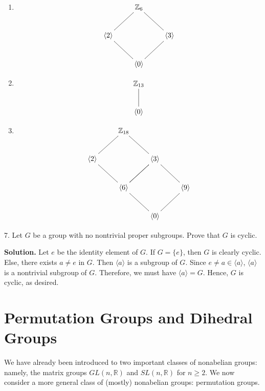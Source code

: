 \documentclass[10pt,]{book}
\theoremstyle{plain}
\theoremstyle{definition}
\theoremstyle{definition}
\theoremstyle{definition}
\theoremstyle{definition}
\numberwithin{equation}{section}
\def\Z{\mathbb{Z}}
\def\R{\mathbb{R}}
\begin{document}
\begin{exerciselist}
\begin{enumerate}[label=(\alph*)]
\item\hypertarget{li-321}{}{
\[\xymatrix{&\Z_6&\\ \langle 2\rangle \ar@{-}[ur]&&\langle 3\rangle\ar@{-}[ul]\\&\langle 0\rangle \ar@{-}[ul]\ar@{-}[ur]&}\]
}
%
\item\hypertarget{li-322}{}{
\[\xymatrix{\Z_{13}\ar@{-}[d]\\ \langle0\rangle}\]
}
%
\item\hypertarget{li-323}{}{
\[\xymatrix{&\Z_{18}&&\\ \langle 2\rangle\ar@{-}[ur]\ar@{-}[dr]&&\langle 3\rangle\ar@{-}[ul]\ar@{-}[dl]&\\
&\langle 6 \rangle \ar@{-}[dr]\ar@{-}[ur]&& \langle 9 \rangle \ar@{-}[dl]\ar@{-}[ul]\\&& \langle 0 \rangle &}\]
}
%
\end{enumerate}
\item[7.]\hypertarget{exercise-40}{}Let \(G\) be a group with no nontrivial proper subgroups. Prove that \(G\) is cyclic.%
\par\smallskip
\par\smallskip
\noindent\textbf{Solution.}\hypertarget{solution-40}{}\quad
Let \(e\) be the identity element of \(G\). If \(G=\{e\}\), then \(G\) is clearly cyclic. Else, there exists \(a\neq e\) in \(G\). Then \(\langle a\rangle\) is a subgroup of \(G\). Since \(e\neq a\in
\langle a\rangle\), \(\langle a\rangle\) is a nontrivial subgroup of \(G\). Therefore, we must have \(\langle a\rangle =G\). Hence, \(G\) is cyclic, as desired.%
\end{exerciselist}
\typeout{************************************************}
\typeout{************************************************}
\chapter[{Permutation Groups and Dihedral Groups}]{Permutation Groups and Dihedral Groups}\label{perm}
We have already been introduced to two important classes of nonabelian groups: namely, the matrix groups \(GL(n,\R)\) and \(SL(n,\R)\) for \(n\geq 2\). We now consider a more general class of (mostly) nonabelian groups: permutation groups.%
\typeout{************************************************}
\typeout{************************************************}
\end{document}
